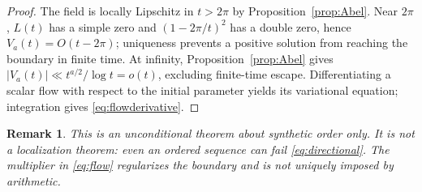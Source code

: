 \documentclass[11pt,a4paper]{article}
\numberwithin{equation}{section}
\newtheorem{remark}[theorem]{Remark}
\begin{document}
\begin{proof}
The field is locally Lipschitz in $t>2\pi$ by Proposition~\ref{prop:Abel}. Near $2\pi$, $L(t)$ has a simple zero and $(1-2\pi/t)^2$ has a double zero, hence $V_a(t)=O(t-2\pi)$; uniqueness prevents a positive solution from reaching the boundary in finite time. At infinity, Proposition~\ref{prop:Abel} gives $|V_a(t)|\ll t^{a/2}/\log t=o(t)$, excluding finite-time escape. Differentiating a scalar flow with respect to the initial parameter yields its variational equation; integration gives \eqref{eq:flowderivative}.
\end{proof}
\begin{remark}
This is an unconditional theorem about \emph{synthetic order only}. It is not a localization theorem: even an ordered sequence can fail \eqref{eq:directional}. The multiplier in \eqref{eq:flow} regularizes the boundary and is not uniquely imposed by arithmetic.
\end{remark}
\end{document}
